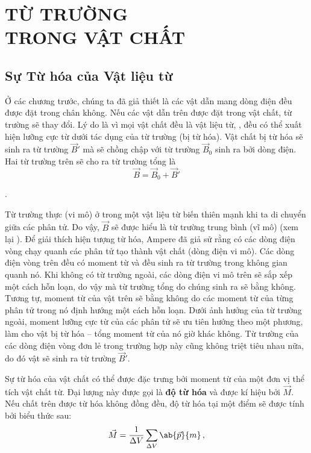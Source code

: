 

\chapter[TỪ TRƯỜNG TRONG VẬT CHẤT]{TỪ TRƯỜNG\\ TRONG VẬT CHẤT}\label{chap:7}

\section{Sự Từ hóa của Vật liệu từ}\label{sec:7_1}

Ở các chương trước, chúng ta đã giả thiết là các vật dẫn mang dòng điện đều được đặt trong chân không.
Nếu các vật dẫn trên được đặt trong vật chất, từ trường sẽ thay đổi.
Lý do là vì mọi vật chất đều là vật liệu từ, \ie, đều có thể xuất hiện lưỡng cực từ dưới tác dụng của từ trường (bị từ hóa).
Vật chất bị từ hóa sẽ sinh ra từ trường $\vec{B}'$ mà sẽ chồng chập với từ trường $\vec{B}_0$ sinh ra bởi dòng điện.
Hai từ trường trên sẽ cho ra từ trường tổng là
\begin{equation}\label{eq:7_1}
    \vec{B} = \vec{B}_0 + \vec{B}'
\end{equation}

.

Từ trường thực (vi mô) ở trong một vật liệu từ biến thiên mạnh khi ta di chuyển giữa các phân tử.
Do vậy, $\vec{B}$ sẽ được hiểu là từ trường trung bình (vĩ mô) (xem lại ).
Để giải thích hiện tượng từ hóa, Ampere đã giả sử rằng có các dòng điện vòng chạy quanh các phân tử tạo thành vật chất (dòng điện vi mô).
Các dòng điện vòng trên đều có moment từ và đều sinh ra từ trường trong không gian quanh nó.
Khi không có từ trường ngoài, các dòng điện vi mô trên sẽ sắp xếp một cách hỗn loạn, do vậy mà từ trường tổng do chúng sinh ra sẽ bằng không.
Tương tự, moment từ của vật trên sẽ bằng không do các moment từ của từng phân tử trong nó định hướng một cách hỗn loạn.
Dưới ảnh hưởng của từ trường ngoài, moment lưỡng cực từ của các phân tử sẽ ưu tiên hướng theo một phương, làm cho vật bị từ hóa -- tổng moment từ của nó giờ khác không. Từ trường của các dòng điện vòng đơn lẻ trong trường hợp này cũng không triệt tiêu nhau nữa, do đó vật sẽ sinh ra từ trường $\vec{B}'$.

Sự từ hóa của vật chất có thể được đặc trưng bởi moment từ của một đơn vị thể tích vật chất từ.
Đại lượng này được gọi là \textbf{độ từ hóa} và được kí hiệu bởi $\vec{M}$.
Nếu chất trên được từ hóa không đồng đều, độ từ hóa tại một điểm sẽ được tính bởi biểu thức sau:
\begin{equation}\label{eq:7_2}
    \vec{M} = \frac{1}{\Delta{V}} \sum_{\Delta{V}} \ab{\vec{p}}{m}\,,
\end{equation}

